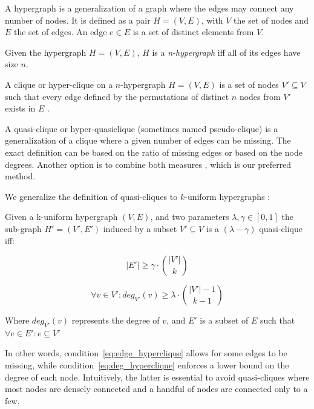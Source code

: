 A hypergraph is a generalization of a graph where the edges may connect any number
of nodes.
It is defined as a pair $H = (V, E)$, with $V$ the set of nodes and $E$ the set of edges. An edge $e \in E$ is a set of distinct elements from $V$.

\begin{definition}
    \label{def:khypergraph}    
    Given the hypergraph $H = (V, E)$, $H$ is a \emph{n-hypergraph} iff
    all of its edges have size $n$.
\end{definition}

A clique or hyper-clique on a $n$-hypergraph $H = (V, E)$ is a set of nodes
$V' \subseteq V$ such that
every edge defined by the permutations of distinct $n$ nodes from $V'$ exists in $E$
\cite{koeller2003discovery}.

A quasi-clique or hyper-quasiclique (sometimes named pseudo-clique) is a generalization of a clique
where a given number of edges can be missing. The exact definition can be based
on the ratio of missing edges or based on the node degrees. Another option
is to combine both measures \cite{brunato2007effectively}, which is our preferred method.

We generalize the definition of quasi-cliques to $k$-uniform hypergraphs :

\begin{definition}
    \label{def:quasi_clique}
    Given a k-uniform hypergraph $(V,E)$, and two parameters $\lambda, \gamma \in [0,1]$
    the sub-graph $H'=(V',E')$ induced by a subset $V' \subseteq V$ is a
    $(\lambda-\gamma)$ quasi-clique iff:
    
    \begin{equation}
        |E'| \ge \gamma \cdot \binom{|V'|}{k}
        \label{eq:edge_hyperclique}
    \end{equation}
    
    \begin{equation}
        \forall v \in V': deg_{V'}(v) \ge \lambda \cdot \binom{|V'| - 1}{k - 1}
        \label{eq:deg_hyperclique}
    \end{equation}
    
    Where $deg_{V'}(v)$ represents the degree of $v$, and $E'$ is a subset of $E$ such that
    $\forall e \in E' : e \subseteq V'$
\end{definition}

In other words, condition~\ref{eq:edge_hyperclique} allows for some edges to be missing,
while condition~\ref{eq:deg_hyperclique} enforces a lower bound on the degree of each
node. Intuitively, the latter is essential to avoid quasi-cliques where most nodes
are densely connected and a handful of nodes are connected only to a few.

